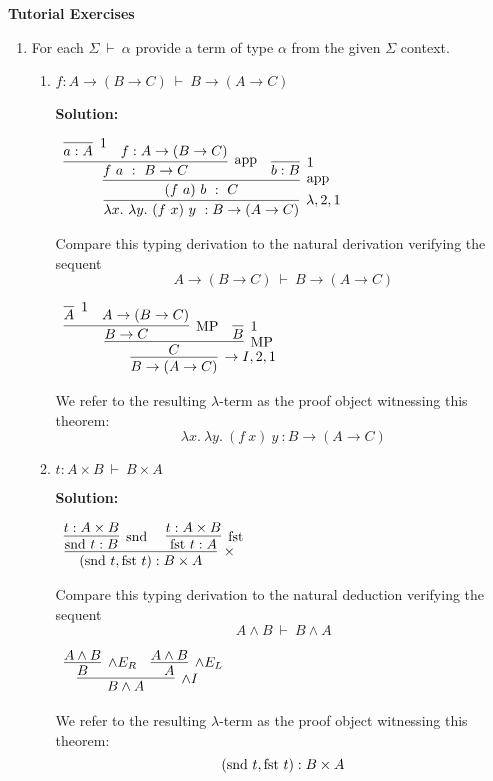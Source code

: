 \documentclass[11pt]{report}
\begin{document}
\newpage
{\bf Tutorial Exercises}

\begin{enumerate}
	\item For each $\Sigma \ \vdash \ \alpha$ provide a term of type $\alpha$ from the given $\Sigma$ context. 
	\begin{enumerate}
		\item $f : A \to (B \to C) \ \vdash \ B \to (A \to C)$
		
		{\bf Solution:}
		\begin{center}
			$\begin{array}{c}
				\infer[\lambda,2,1]{\lambda x. \ \lambda y. \ (f \ x) \ y \ : B \to (A \to C)}
					{\infer[\app]{(f \ a) \ b \ : \ C}
						{\infer[\app]{f \ a \ : \ B \to C}
							{\infer[1]{a : A}{}
							&
							f : A \to (B \to C)}
						&
						\infer[1]{b : B}{}}}
			\end{array}$	
		\end{center}
		Compare this typing derivation to the natural derivation verifying the sequent
		$$A \to (B \to C) \ \vdash \ B \to (A \to C)$$		
		\begin{center}
			$\begin{array}{c}
				\infer[\to I,2,1]{B \to (A \to C)}
					{\infer[\MP]{C}
						{\infer[\MP]{B \to C}
							{\infer[1]{A}{}
							&
							A \to (B \to C)}
						&
						\infer[1]{B}{}}}
			\end{array}$	
		\end{center}
		We refer to the resulting $\lambda$-term as the proof object witnessing this theorem:
		$$\lambda x. \ \lambda y. \ (f \ x) \ y \ : B \to (A \to C)$$		
		
		\item $t : A \times B \ \vdash \ B \times A$
		
		\textbf{Solution:}
		\begin{center}
			$\begin{array}{c}
				\infer[\times]{(\snd t, \fst t) : B \times A}
					{\infer[\snd]{\snd t : B}{t : A \times B}
					&
					\infer[\fst]{\fst t : A}{t : A \times B}}
			\end{array}$		
		\end{center}
		Compare this typing derivation to the natural deduction verifying the sequent
		$$A \land B \ \vdash \ B \land A$$
		\begin{center}
			$\begin{array}{c}
				\infer[\land I]{B \land A}
					{\infer[\land E_{R}]{B}{A \land B}
					&
					\infer[\land E_{L}]{A}{A \land B}}
			\end{array}$		
		\end{center}
		We refer to the resulting $\lambda$-term as the proof object witnessing this theorem:
		$$(\text{snd } t, \text{fst } t) : B \times A$$		
		

\end{enumerate}
\end{enumerate}
\end{document}
